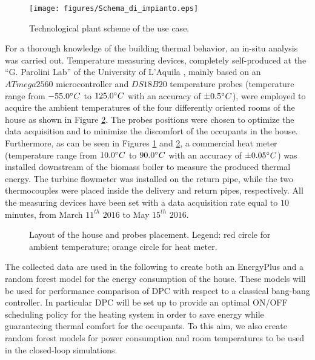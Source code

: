 \begin{figure}[h!]
	\begin{center}
		\texttt{[image: figures/Schema\_di\_impianto.eps]}
		\caption{Technological plant scheme of the use case.}
		\captionsetup{justification=centering}
		\label{F:housePlantScheme}
	\end{center}
\end{figure}
For a thorough knowledge of the building thermal behavior, an in-situ analysis was carried out. Temperature measuring devices, completely self-produced at the “G. Parolini Lab” of the University of L'Aquila \cite{Pantoli2017}, mainly based on an $ATmega 2560$ microcontroller and $DS18B20$ temperature probes (temperature range from $-55.0\degree C$ to $125.0\degree C$ with an accuracy of $\pm 0.5\degree C$), were employed to acquire the ambient temperatures of the four differently oriented rooms of the house as shown in Figure \ref{F:houseFloors}. The probes positions were chosen to optimize the data acquisition and to minimize the discomfort of the occupants in the house. Furthermore, as can be seen in Figures \ref{F:housePlantScheme} and \ref{F:houseFloors}, a commercial heat meter (temperature range from $10.0\degree C$ to $90.0\degree C$ with an accuracy of $\pm 0.05\degree C$) was installed downstream of the biomass boiler to measure the produced thermal energy. The turbine flowmeter was installed on the return pipe, while the two thermocouples were placed inside the delivery and return pipes, respectively. All the measuring devices have been set with a data acquisition rate equal to $10$ minutes, from March $11^{th}$ $2016$ to May $15^{th}$ $2016$.
\begin{figure}[h!]
	\begin{center}
	\end{center}
	\caption{Layout of the house and probes placement. Legend: red circle for ambient temperature; orange circle for heat meter.}
	\captionsetup{justification=centering}
	\label{F:houseFloors}
\end{figure}

The collected data are used in the following to create both an EnergyPlus and a random forest model for the energy consumption of the house. These models will be used for performance comparison of DPC with respect to a classical bang-bang controller. In particular DPC will be set up to provide an optimal ON/OFF scheduling policy for the heating system in order to save energy while guaranteeing thermal comfort for the occupants. To this aim, we also create random forest models for power consumption and room temperatures to be used in the closed-loop simulations. 

